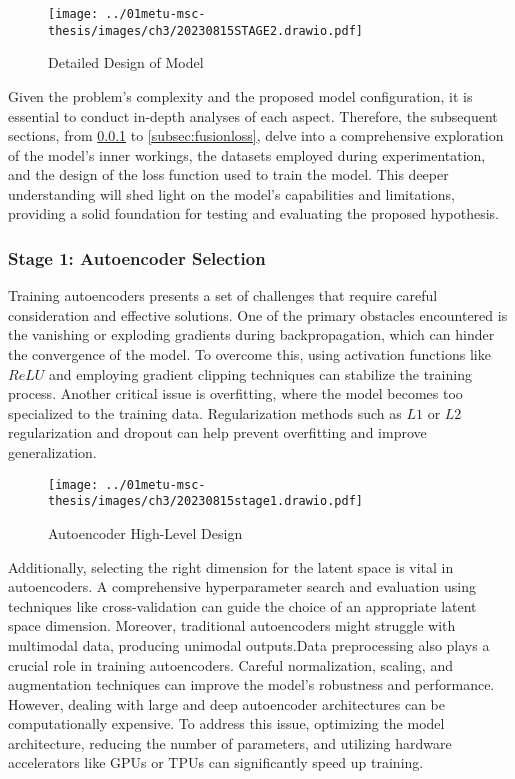 \begin{figure}[htbp]
    \centering
    \texttt{[image: ../01metu-msc-thesis/images/ch3/20230815STAGE2.drawio.pdf]}
    \caption{Detailed Design of Model}
    \label{fig:ch3:highlevel2}
\end{figure}

Given the problem's complexity and the proposed model configuration, it is essential to conduct in-depth analyses of each aspect. Therefore, the subsequent sections, from \ref{subsec:aesel} to \ref{subsec:fusionloss}, delve into a comprehensive exploration of the model's inner workings, the datasets employed during experimentation, and the design of the loss function used to train the model. This deeper understanding will shed light on the model's capabilities and limitations, providing a solid foundation for testing and evaluating the proposed hypothesis.

\subsubsection{Stage 1: Autoencoder Selection} \label{subsec:aesel}

Training autoencoders presents a set of challenges that require careful consideration and effective solutions. One of the primary obstacles encountered is the vanishing or exploding gradients during backpropagation, which can hinder the convergence of the model. To overcome this, using activation functions like $ReLU$ and employing gradient clipping techniques can stabilize the training process. Another critical issue is overfitting, where the model becomes too specialized to the training data. Regularization methods such as $L1$ or $L2$ regularization and dropout can help prevent overfitting and improve generalization.

\begin{figure}[htbp]
    \centering
    \texttt{[image: ../01metu-msc-thesis/images/ch3/20230815stage1.drawio.pdf]}
    \centering
    \caption{Autoencoder High-Level Design}
    \label{fig:ch3:encoderhighlevel}
\end{figure}

Additionally, selecting the right dimension for the latent space is vital in autoencoders. A comprehensive hyperparameter search and evaluation using techniques like cross-validation can guide the choice of an appropriate latent space dimension. Moreover, traditional autoencoders might struggle with multimodal data, producing unimodal outputs.Data preprocessing also plays a crucial role in training autoencoders. Careful normalization, scaling, and augmentation techniques can improve the model's robustness and performance. However, dealing with large and deep autoencoder architectures can be computationally expensive. To address this issue, optimizing the model architecture, reducing the number of parameters, and utilizing hardware accelerators like GPUs or TPUs can significantly speed up training.

